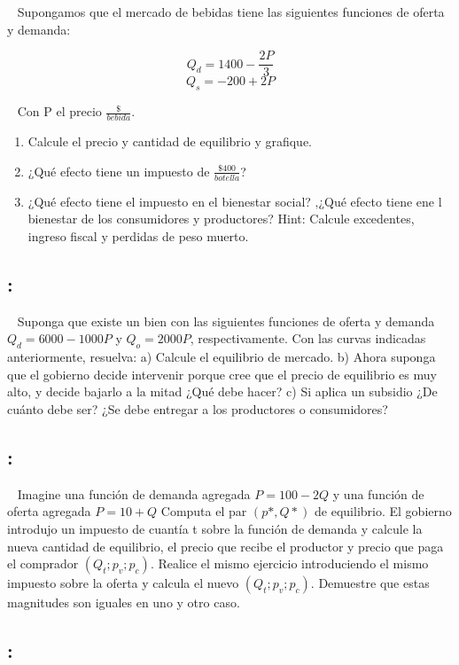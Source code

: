 \documentclass[
  letterpaper,
  DIV=11,
  numbers=noendperiod]{scrreport}
\begin{document}
~ Supongamos que el mercado de bebidas tiene las siguientes funciones de
oferta y demanda:

\[Q_d = 1400 - \frac{2P}{3}\] \[Q_s = -200 +2P\]

~ Con P el precio \(\frac{\$}{bebida}\).

\begin{enumerate}
\def\labelenumi{\alph{enumi})}
\item
  Calcule el precio y cantidad de equilibrio y grafique.
\item
  ¿Qué efecto tiene un impuesto de \(\frac{\$400}{botella}\)?
\item
  ¿Qué efecto tiene el impuesto en el bienestar social? ‚¿Qué efecto
  tiene ene l bienestar de los consumidores y productores? Hint: Calcule
  excedentes, ingreso fiscal y perdidas de peso muerto.
\end{enumerate}

\hypertarget{section-49}{%
\subsection{:}\label{section-49}}

~ Suponga que existe un bien con las siguientes funciones de oferta y
demanda \(Q_d=6000-1000P\) y \(Q_o=2000P\), respectivamente. Con las
curvas indicadas anteriormente, resuelva: a) Calcule el equilibrio de
mercado. b) Ahora suponga que el gobierno decide intervenir porque cree
que el precio de equilibrio es muy alto, y decide bajarlo a la mitad
¿Qué debe hacer? c) Si aplica un subsidio ¿De cuánto debe ser? ¿Se debe
entregar a los productores o consumidores?

\hypertarget{section-50}{%
\subsection{:}\label{section-50}}

~ Imagine una función de demanda agregada \(P=100-2Q\) y una función de
oferta agregada \(P=10+Q\) Computa el par \((p*,Q*)\) de equilibrio. El
gobierno introdujo un impuesto de cuantía t sobre la función de demanda
y calcule la nueva cantidad de equilibrio, el precio que recibe el
productor y precio que paga el comprador \((Q_t;p_v;p_c)\). Realice el
mismo ejercicio introduciendo el mismo impuesto sobre la oferta y
calcula el nuevo \((Q_t;p_v;p_c)\). Demuestre que estas magnitudes son
iguales en uno y otro caso.

\hypertarget{section-51}{%
\subsection{:}\label{section-51}}
\end{document}
